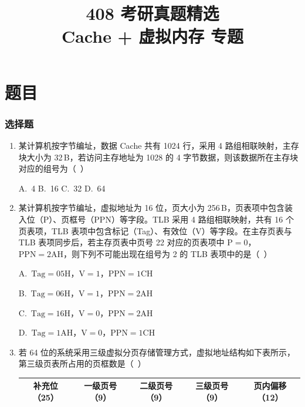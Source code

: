 \documentclass[12pt,a4paper]{ctexart}
\title{{\Huge 408 考研真题精选}\\ \Large Cache + 虚拟内存 专题}
\author{}
\date{}
\begin{document}
\maketitle
\tableofcontents
\newpage


\part{题目}

\section{选择题}

\begin{enumerate}[leftmargin=*]

\item 某计算机按字节编址，数据 Cache 共有 1024 行，采用 4 路组相联映射，主存块大小为 32\,B，若访问主存地址为 1028 的 4 字节数据，则该数据所在主存块对应的组号为（~）

A.~4 \quad B.~16 \quad C.~32 \quad D.~64

\item 某计算机按字节编址，虚拟地址为 16 位，页大小为 256\,B，页表项中包含装入位（P）、页框号（PPN）等字段。TLB 采用 4 路组相联映射，共有 16 个页表项，TLB 表项中包含标记（Tag）、有效位（V）等字段。在主存页表与 TLB 表项同步后，若主存页表中页号 22 对应的页表项中 $\mathrm{P}=0$，$\mathrm{PPN}=\mathrm{2AH}$，则下列不可能出现在组号为 2 的 TLB 表项中的是（~）

A.~$\mathrm{Tag}=\mathrm{05H}$，$\mathrm{V}=1$，$\mathrm{PPN}=\mathrm{1CH}$

B.~$\mathrm{Tag}=\mathrm{06H}$，$\mathrm{V}=1$，$\mathrm{PPN}=\mathrm{2AH}$

C.~$\mathrm{Tag}=\mathrm{16H}$，$\mathrm{V}=0$，$\mathrm{PPN}=\mathrm{2AH}$

D.~$\mathrm{Tag}=\mathrm{1AH}$，$\mathrm{V}=0$，$\mathrm{PPN}=\mathrm{1CH}$

\item 若 64 位的系统采用三级虚拟分页存储管理方式，虚拟地址结构如下表所示，第三级页表所占用的页框数是（~）

\begin{center}
\begin{tabular}{|c|c|c|c|c|}
\hline
补充位（25） & 一级页号（9） & 二级页号（9） & 三级页号（9） & 页内偏移（12） \\
\hline
\end{tabular}
\end{center}


\end{enumerate}
\end{document}
